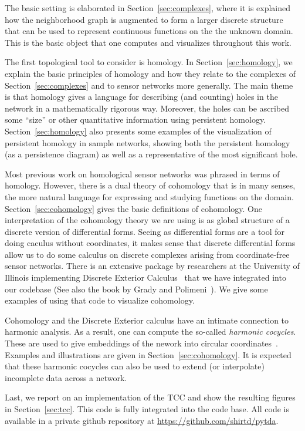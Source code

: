   The basic setting is elaborated in Section~\ref{sec:complexes}, where it is explained how the neighborhood graph is augmented to form a larger discrete structure that can be used to represent continuous functions on the the unknown domain.
  This is the basic object that one computes and visualizes throughout this work.

  The first topological tool to consider is homology.
  In Section~\ref{sec:homology}, we explain the basic principles of homology and how they relate to the complexes of Section~\ref{sec:complexes} and to sensor networks more generally.
  The main theme is that homology gives a language for describing (and counting) holes in the network in a mathematically rigorous way.
  Moreover, the holes can be ascribed some ``size'' or other quantitative information using persistent homology.
  Section~\ref{sec:homology} also presents some examples of the visualization of persistent homology in sample networks, showing both the persistent homology (as a persistence diagram) as well as a representative of the most significant hole.

  Most previous work on homological sensor networks was phrased in terms of homology.
  However, there is a dual theory of cohomology that is in many senses, the more natural language for expressing and studying functions on the domain.
  Section~\ref{sec:cohomology} gives the basic definitions of cohomology.
  One interpretation of the cohomology theory we are using is as global structure of a discrete version of differential forms.
  Seeing as differential forms are a tool for doing caculus without coordinates, it makes sense that discrete differential forms allow us to do some calculus on discrete complexes arising from coordinate-free sensor networks.
  There is an extensive package by researchers at the University of Illinois implementing Discrete Exterior Calculus~\cite{bell12pydec} that we have integrated into our codebase (See also the book by Grady and Polimeni~\cite{grady10discrete}).
  We give some examples of using that code to visualize cohomology.

  Cohomology and the Discrete Exterior calculus have an intimate connection to harmonic analysis.
  As a result, one can compute the so-called \emph{harmonic cocycles}.
  These are used to give embeddings of the nework into circular coordinates~\cite{desilva09persistent}.
  Examples and illustrations are given in Section~\ref{sec:cohomology}.
  It is expected that these harmonic cocycles can also be used to extend (or interpolate) incomplete data across a network.

  Last, we report on an implementation of the TCC and show the resulting figures in Section~\ref{sec:tcc}.
  This code is fully integrated into the code base.
  All code is available in a private github repository at \url{https://github.com/shirtd/pytda}.



